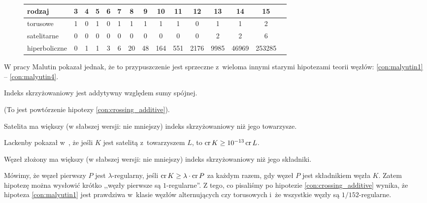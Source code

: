 \begin{figure}[H]
\renewcommand*{\arraystretch}{1.4}
\footnotesize
\begin{longtable}{lcccccccccccccc}
\hline
    \textbf{rodzaj} & 3 & 4 & 5 & 6 & 7 & 8  & 9  & 10  & 11  & 12   & 13   & 14    & 15     \\ \hline \endhead
    torusowe        & 1 & 0 & 1 & 0 & 1 & 1  & 1  & 1   & 1   & 0    & 1    & 1     & 2      \\
    satelitarne     & 0 & 0 & 0 & 0 & 0 & 0  & 0  & 0   & 0   & 0    & 2    & 2     & 6      \\
    hiperboliczne   & 0 & 1 & 1 & 3 & 6 & 20 & 48 & 164 & 551 & 2176 & 9985 & 46969 & 253285 \\
    \hline
\end{longtable}
\normalsize
\end{figure}

W pracy \cite{malyutin16} Malutin pokazał jednak, że to przypuszczenie jest sprzeczne z~wieloma innymi starymi hipotezami teorii węzłów: \ref{con:malyutin1} -- \ref{con:malyutin4}.

\begin{conjecture}
    \label{con:malyutin1}
    Indeks skrzyżowaniowy jest addytywny względem sumy spójnej.
\end{conjecture}

(To jest powtórzenie hipotezy \ref{con:crossing_additive}).

\begin{conjecture}
    Satelita ma większy (w słabszej wersji: nie mniejszy) indeks skrzyżowaniowy niż jego towarzysze.
\end{conjecture}

Lackenby pokazał w~\cite{lackenby14}, że jeśli $K$ jest satelitą z~towarzyszem $L$, to $\operatorname{cr} K \ge 10^{-13} \operatorname{cr} L$.

\begin{conjecture}
    Węzeł złożony ma większy (w słabszej wersji: nie mniejszy) indeks skrzyżowaniowy niż jego składniki.
\end{conjecture}

Mówimy, że węzeł pierwszy $P$ jest $\lambda$-regularny, jeśli $\operatorname{cr} K \ge \lambda \cdot \operatorname{cr} P$ za każdym razem, gdy węzeł $P$ jest składnikiem węzła $K$.
Zatem hipotezę można wysłowić krótko ,,węzły pierwsze są $1$-regularne''.
Z tego, co pisaliśmy po hipotezie \ref{con:crossing_additive} wynika, że hipoteza \ref{con:malyutin1} jest prawdziwa w~klasie węzłów alternujących czy torusowych i~że wszystkie węzły są $1/152$-regularne.

